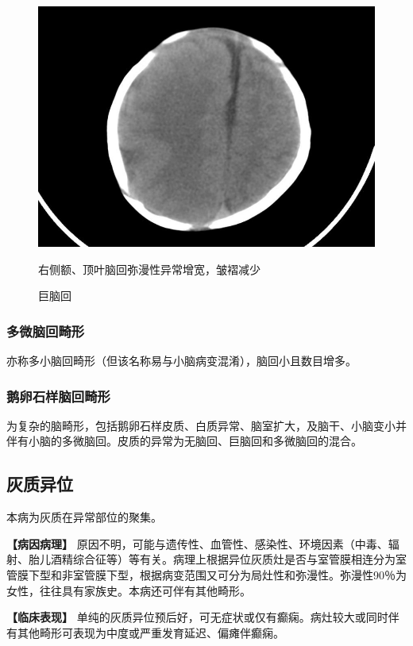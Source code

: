 \begin{figure}[!htbp]
 {\centering
 \includegraphics[width=.7\textwidth,height=\textheight,keepaspectratio]{./images/Image00025.jpg}
 \captionsetup{justification=centering}
 \caption{巨脑回}
 \label{fig2-9}}

 右侧额、顶叶脑回弥漫性异常增宽，皱褶减少
  \end{figure} 



\subsubsection{多微脑回畸形}

亦称多小脑回畸形（但该名称易与小脑病变混淆），脑回小且数目增多。

\subsubsection{鹅卵石样脑回畸形}

为复杂的脑畸形，包括鹅卵石样皮质、白质异常、脑室扩大，及脑干、小脑变小并伴有小脑的多微脑回。皮质的异常为无脑回、巨脑回和多微脑回的混合。

\subsection{灰质异位}

本病为灰质在异常部位的聚集。

\textbf{【病因病理】}
原因不明，可能与遗传性、血管性、感染性、环境因素（中毒、辐射、胎儿酒精综合征等）等有关。病理上根据异位灰质灶是否与室管膜相连分为室管膜下型和非室管膜下型，根据病变范围又可分为局灶性和弥漫性。弥漫性90％为女性，往往具有家族史。本病还可伴有其他畸形。

\textbf{【临床表现】}
单纯的灰质异位预后好，可无症状或仅有癫痫。病灶较大或同时伴有其他畸形可表现为中度或严重发育延迟、偏瘫伴癫痫。

